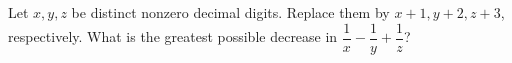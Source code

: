 Let $x,y,z$ be distinct nonzero decimal digits. Replace them by $x+1,y+2,z+3$, respectively. What is the greatest possible decrease in $\dfrac{1}{x}-\dfrac{1}{y}+\dfrac{1}{z}$?
